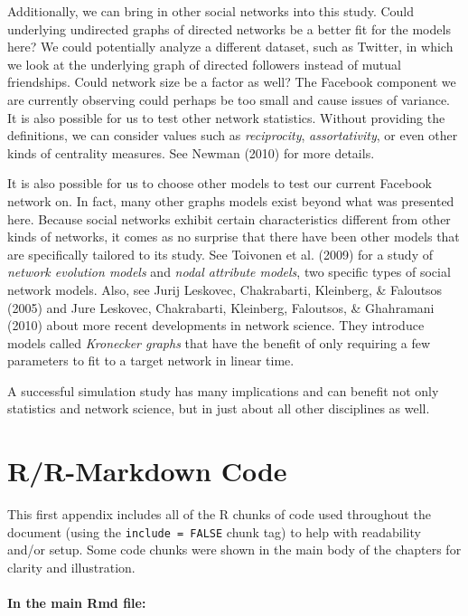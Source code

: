 \documentclass[12pt,twoside]{amherstthesis}
\begin{document}
  Additionally, we can bring in other social networks into this study.
  Could underlying undirected graphs of directed networks be a better fit
  for the models here? We could potentially analyze a different dataset,
  such as Twitter, in which we look at the underlying graph of directed
  followers instead of mutual friendships. Could network size be a factor
  as well? The Facebook component we are currently observing could perhaps
  be too small and cause issues of variance. It is also possible for us to
  test other network statistics. Without providing the definitions, we can
  consider values such as \emph{reciprocity}, \emph{assortativity}, or
  even other kinds of centrality measures. See Newman (2010) for more
  details.
  
  It is also possible for us to choose other models to test our current
  Facebook network on. In fact, many other graphs models exist beyond what
  was presented here. Because social networks exhibit certain
  characteristics different from other kinds of networks, it comes as no
  surprise that there have been other models that are specifically
  tailored to its study. See Toivonen et al. (2009) for a study of
  \emph{network evolution models} and \emph{nodal attribute models}, two
  specific types of social network models. Also, see Jurij Leskovec,
  Chakrabarti, Kleinberg, \& Faloutsos (2005) and Jure Leskovec,
  Chakrabarti, Kleinberg, Faloutsos, \& Ghahramani (2010) about more
  recent developments in network science. They introduce models called
  \emph{Kronecker graphs} that have the benefit of only requiring a few
  parameters to fit to a target network in linear time.
  
  A successful simulation study has many implications and can benefit not
  only statistics and network science, but in just about all other
  disciplines as well.
  
  \singlespacing
  \appendix
  
  \chapter{R/R-Markdown Code}\label{rr-markdown-code}
  
  This first appendix includes all of the R chunks of code used throughout
  the document (using the \texttt{include\ =\ FALSE} chunk tag) to help
  with readability and/or setup. Some code chunks were shown in the main
  body of the chapters for clarity and illustration.
  
  \subsubsection{In the main Rmd file:}\label{in-the-main-rmd-file}
  
\end{document}
